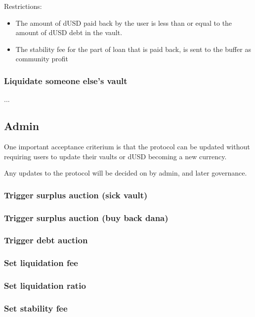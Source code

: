 \documentclass{article} %
\begin{document}
Restrictions:
\begin{itemize}
  \item The amount of dUSD paid back by the user is less than or equal to the
    amount of dUSD debt in the vault.
  \item The stability fee for the part of loan that is paid back, is sent to the
    buffer as community profit
\end{itemize}

\subsubsection{Liquidate someone else's vault}

...

\subsection{Admin}

One important acceptance criterium is that the protocol can be updated without
requiring users to update their vaults or dUSD becoming a new currency.

Any updates to the protocol will be decided on by admin, and later governance.

\subsubsection{Trigger surplus auction (sick vault)}

\subsubsection{Trigger surplus auction (buy back dana)}

\subsubsection{Trigger debt auction}

\subsubsection{Set liquidation fee}

\subsubsection{Set liquidation ratio}

\subsubsection{Set stability fee}
\end{document}
